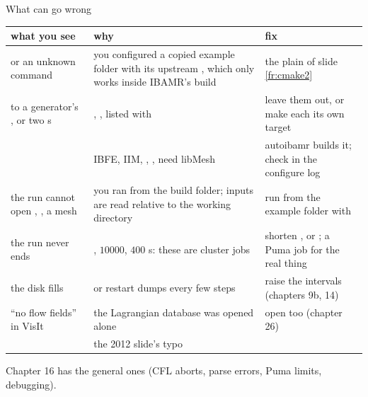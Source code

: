 \documentclass[aspectratio=169,11pt]{beamer}
\begin{document}
\begin{frame}{What can go wrong}
\label{fr:wrong}
\scriptsize
\setlength{\tabcolsep}{3pt}
\begin{tabular}{@{}L{0.3\textwidth}L{0.36\textwidth}L{0.3\textwidth}@{}}
\toprule
what you see & why & fix\\
\midrule
{} or an unknown command  & you configured a copied example folder with its upstream , which only works inside IBAMR's build & the plain  of slide \ref{fr:cmake2}\\
 to a generator's , or two s & , ,  listed with  & leave them out, or make each its own target\\
 & IBFE, IIM, , ,  need libMesh & autoibamr builds it; check  in the configure log\\
the run cannot open , , a  mesh & you ran from the build folder; inputs are read relative to the working directory & run from the example folder with \\
the run never ends & , $10000$, $400$ s: these are cluster jobs & shorten , or ; a Puma job for the real thing\\
the disk fills &  or restart dumps every few steps & raise the intervals (chapters 9b, 14)\\
``no flow fields'' in VisIt & the Lagrangian database was opened alone & open  too (chapter 26)\\
 & the 2012 slide's typo & \\
\bottomrule
\end{tabular}
\vspace{1mm}

\scriptsize Chapter 16 has the general ones (CFL aborts, parse errors, Puma limits, debugging).
\end{frame}
\end{document}
